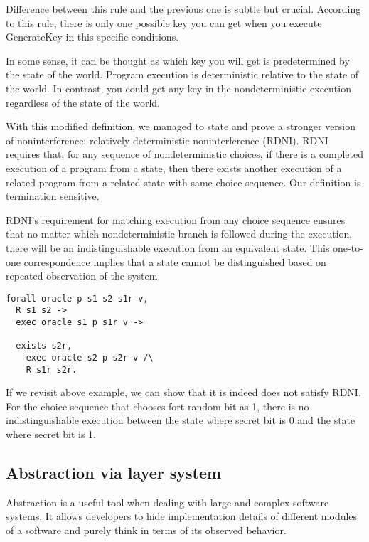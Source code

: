 Difference between this rule and the previous one is subtle but crucial. 
According to this rule, there is only one possible key you can get when you execute GenerateKey in this specific conditions.

In some sense, it can be thought as which key you will get is predetermined by the state of the world. Program execution is deterministic relative to the state of the world.
In contrast, you could get any key in the nondeterministic execution regardless of the state of the world.


With this modified definition, we managed to state and prove a stronger version of noninterference: relatively deterministic noninterference (RDNI). RDNI requires that, for any sequence of nondeterministic choices, if there is a completed execution of a program from a state, then there exists another execution of a related program from a related state with same choice sequence. Our definition is termination sensitive.

RDNI's requirement for matching execution from any choice sequence ensures that no matter which nondeterministic branch is followed during the execution, there will be an indistinguishable execution from an equivalent state. This one-to-one correspondence implies that a state cannot be distinguished based on repeated observation of the system.

\begin{lstlisting}
forall oracle p s1 s2 s1r v,
  R s1 s2 ->
  exec oracle s1 p s1r v ->

  exists s2r,
    exec oracle s2 p s2r v /\
    R s1r s2r.
\end{lstlisting}

If we revisit above example, we can show that it is indeed does not satisfy RDNI. For the choice sequence that chooses fort random bit as 1, there is no indistinguishable execution between the state where secret bit is 0 and the state where secret bit is 1.

\subsection{Abstraction via layer system}
Abstraction is a useful tool when dealing with large and complex software systems.
It allows developers to hide implementation details of different modules of a software and purely think in terms of its observed behavior.

